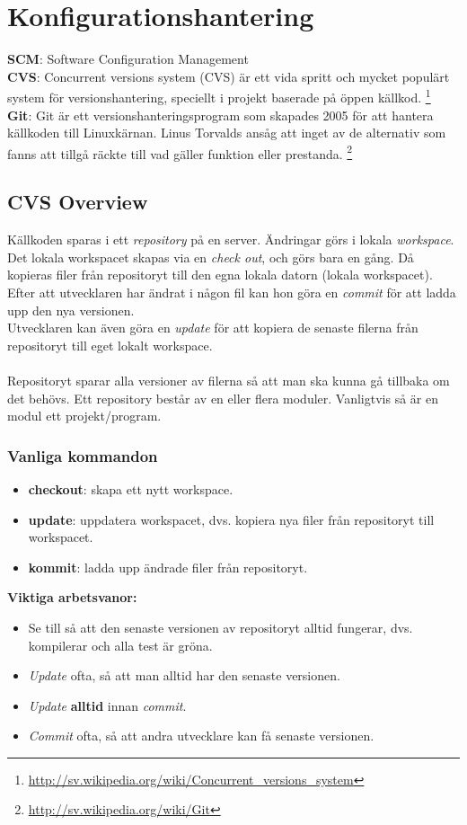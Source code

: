 \documentclass[a4paper]{article}
\begin{document}
\section{Konfigurationshantering} %
\textbf{SCM}: Software Configuration Management \\
\textbf{CVS}: Concurrent versions system (CVS) är ett vida spritt och mycket populärt system för versionshantering, speciellt i projekt baserade på öppen källkod. \footnote{ \url{http://sv.wikipedia.org/wiki/Concurrent_versions_system} 
} \\
\textbf{Git}: Git är ett versionshanteringsprogram som skapades 2005 för att hantera källkoden till Linuxkärnan. Linus Torvalds ansåg att inget av de alternativ som fanns att tillgå räckte till vad gäller funktion eller prestanda. \footnote{ \url{http://sv.wikipedia.org/wiki/Git}}
\subsection{CVS Overview}
Källkoden sparas i ett \emph{repository} på en server. Ändringar görs i lokala \emph{workspace}. Det lokala workspacet skapas via en \emph{check out}, och görs bara en gång. Då kopieras filer från repositoryt till den egna lokala datorn (lokala workspacet). \\
Efter att utvecklaren har ändrat i någon fil kan hon göra en \emph{commit} för att ladda upp den nya versionen. \\
Utvecklaren kan även göra en \emph{update} för att kopiera de senaste filerna från repositoryt till eget lokalt workspace. \\ \\
Repositoryt sparar alla versioner av filerna så att man ska kunna gå tillbaka om det behövs. Ett repository består av en eller flera moduler. Vanligtvis så är en modul ett projekt/program. 
\subsubsection{Vanliga kommandon}
\begin{itemize}
\item{\textbf{checkout}: skapa ett nytt workspace.}
\item{\textbf{update}: uppdatera workspacet, dvs. kopiera nya filer från repositoryt till workspacet.}
\item{\textbf{kommit}: ladda upp ändrade filer från repositoryt.}
\end{itemize}
\begin{tips}[]
\textbf{Viktiga arbetsvanor:}
\begin{itemize}
\item{Se till så att den senaste versionen av repositoryt alltid fungerar, dvs. kompilerar och alla test är gröna.}
\item{\emph{Update} ofta, så att man alltid har den senaste versionen.}
\item{\emph{Update} \textbf{alltid} innan \emph{commit}.}
\item{\emph{Commit} ofta, så att andra utvecklare kan få senaste versionen.} 
\end{itemize}
\end{tips}
\end{document}
